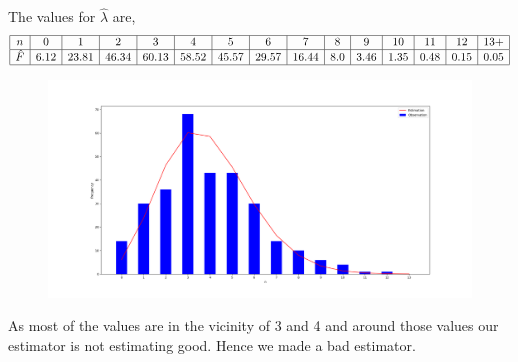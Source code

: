 \documentclass{article}
\theoremstyle{mytheoremstyle}
\theoremstyle{mytheoremstyle}
\theoremstyle{myproblemstyle}
\begin{document}
The values for \(\hat{\lambda}\) are,
\begin{equation*}
	\begin{array}{|c|c|c|c|c|c|c|c|c|c|c|c|c|c|c|}
		\hline
		n       & 0    & 1     & 2     & 3     & 4     & 5     & 6     & 7     & 8   & 9    & 10   & 11   & 12   & 13+  \\\hline
		\hat{F} & 6.12 & 23.81 & 46.34 & 60.13 & 58.52 & 45.57 & 29.57 & 16.44 & 8.0 & 3.46 & 1.35 & 0.48 & 0.15 & 0.05 \\\hline
	\end{array}
\end{equation*}
\begin{figure}[h]
	\center
	\includegraphics[width=\textwidth]{fig.png}
\end{figure}

As most of the values are in the vicinity of 3 and 4 and around those values our estimator is not estimating good. Hence we made a bad estimator.
\end{document}
